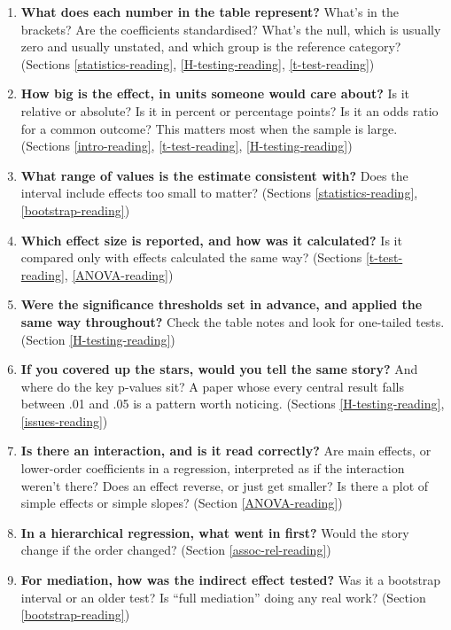 \documentclass[
]{book}
\providecommand{\tightlist}{%
  \setlength{\itemsep}{0pt}\setlength{\parskip}{0pt}}
\begin{document}
\begin{enumerate}
\def\labelenumi{\arabic{enumi}.}
\setcounter{enumi}{14}
\tightlist
\item
  \textbf{What does each number in the table represent?} What's in the brackets? Are the coefficients standardised? What's the null, which is usually zero and usually unstated, and which group is the reference category? (Sections \ref{statistics-reading}, \ref{H-testing-reading}, \ref{t-test-reading})
\item
  \textbf{How big is the effect, in units someone would care about?} Is it relative or absolute? Is it in percent or percentage points? Is it an odds ratio for a common outcome? This matters most when the sample is large. (Sections \ref{intro-reading}, \ref{t-test-reading}, \ref{H-testing-reading})
\item
  \textbf{What range of values is the estimate consistent with?} Does the interval include effects too small to matter? (Sections \ref{statistics-reading}, \ref{bootstrap-reading})
\item
  \textbf{Which effect size is reported, and how was it calculated?} Is it compared only with effects calculated the same way? (Sections \ref{t-test-reading}, \ref{ANOVA-reading})
\item
  \textbf{Were the significance thresholds set in advance, and applied the same way throughout?} Check the table notes and look for one-tailed tests. (Section \ref{H-testing-reading})
\item
  \textbf{If you covered up the stars, would you tell the same story?} And where do the key p-values sit? A paper whose every central result falls between .01 and .05 is a pattern worth noticing. (Sections \ref{H-testing-reading}, \ref{issues-reading})
\item
  \textbf{Is there an interaction, and is it read correctly?} Are main effects, or lower-order coefficients in a regression, interpreted as if the interaction weren't there? Does an effect reverse, or just get smaller? Is there a plot of simple effects or simple slopes? (Section \ref{ANOVA-reading})
\item
  \textbf{In a hierarchical regression, what went in first?} Would the story change if the order changed? (Section \ref{assoc-rel-reading})
\item
  \textbf{For mediation, how was the indirect effect tested?} Was it a bootstrap interval or an older test? Is ``full mediation'' doing any real work? (Section \ref{bootstrap-reading})
\end{enumerate}
\end{document}
